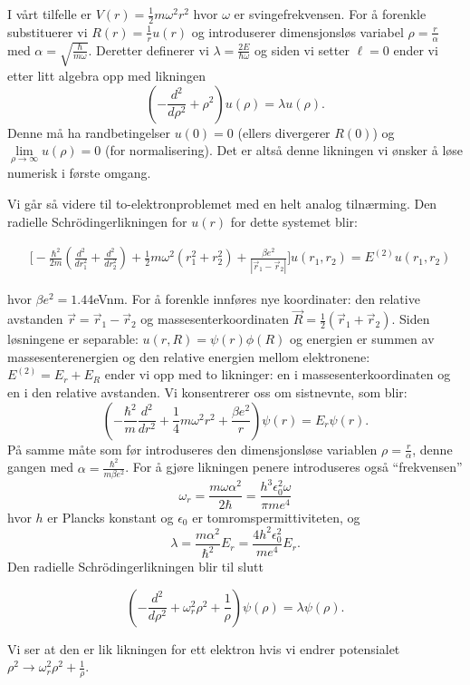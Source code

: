 \documentclass[norsk, 12pt]{article}
\newcommand{\f}{\frac}
\begin{document}
I vårt tilfelle er $V(r) = \f{1}{2}m\omega^2r^2$ hvor $\omega$ er svingefrekvensen. For å forenkle
substituerer vi $R(r)= \f{1}{r}u(r)$ og introduserer dimensjonsløs variabel $\rho = \f{r}{\alpha}$ med
$\alpha = \sqrt{\f{\hbar}{m\omega}}$. Deretter definerer vi $\lambda = \f{2E}{\hbar\omega}$ og siden vi
setter $\ell=0$ ender vi etter litt algebra opp med likningen
$$\left(-\f{d^2}{d\rho^2}+\rho^2\right)u(\rho) = \lambda u(\rho).$$
Denne må ha randbetingelser $u(0)=0$ (ellers divergerer $R(0)$) og $\lim\limits_{\rho\rightarrow\infty}u(\rho)=0$ 
(for normalisering). Det er altså denne likningen vi ønsker å løse numerisk i første omgang.

Vi går så videre til to-elektronproblemet med en helt analog tilnærming. 
Den radielle Schrödingerlikningen for $u(r)$ for dette systemet blir:

\begin{align*}
 &\bigg[-\f{\hbar^2}{2m}\left(\f{d^2}{dr_1^2}+\f{d^2}{dr_2^2}\right)+\f{1}{2}m\omega^2\left(r_1^2+r_2^2\right)+ \f{\beta e^2}{|\vec r_1-\vec r_2|}\bigg]u(r_1,r_2) = E^{(2)}u(r_1,r_2)
\end{align*}

hvor $\beta e^2=1.44$eVnm.
For å forenkle innføres nye koordinater: den relative avstanden $\vec r = \vec r_1-\vec r_2$ og massesenterkoordinaten
$\vec R=\f{1}{2}(\vec r_1+\vec r_2)$. Siden løsningene er separable: $u(r,R) = \psi(r)\phi(R)$ og  energien er summen
av massesenterenergien og den relative energien mellom elektronene: $E^{(2)}=E_r+E_R$ ender vi opp med to likninger:
en i massesenterkoordinaten og en i den relative avstanden. Vi konsentrerer oss om sistnevnte, som blir:
$$\left(-\f{\hbar^2}{m}\f{d^2}{dr^2}+\f{1}{4}m\omega^2r^2+\f{\beta e^2}{r}\right)\psi(r)=E_r\psi(r).$$
På samme måte som før introduseres den dimensjonsløse variablen $\rho = \f{r}{\alpha}$, denne gangen med 
$\alpha = \f{\hbar^2}{m\beta e^2}$. For å gjøre likningen penere introduseres også ``frekvensen''
$$\omega_r = \f{m\omega\alpha^2}{2\hbar} = \f{ h^3\epsilon_0^2\omega}{\pi me^4}$$ hvor $h$ er Plancks konstant og $\epsilon_0$
er tomromspermittiviteten, og 
$$\lambda = \f{m\alpha^2}{\hbar^2}E_r = \f{4h^2\epsilon_0^2}{m e^4}E_r.$$
Den radielle Schrödingerlikningen blir til slutt

$$\left(-\f{d^2}{d\rho^2}+\omega_r^2\rho^2+\f{1}{\rho}\right)\psi(\rho) = \lambda\psi(\rho).$$

Vi ser at den er lik likningen for ett elektron hvis vi endrer potensialet $\rho^2\rightarrow \omega_r^2\rho^2+\f{1}{\rho}$.
\end{document}
